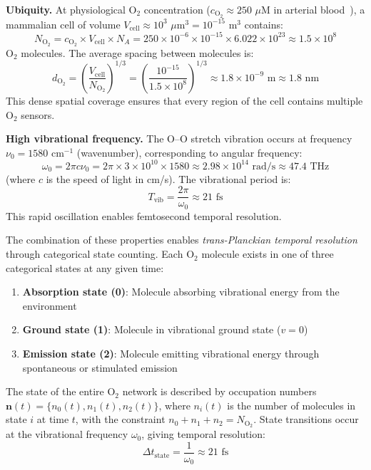 \documentclass[twocolumn,10pt,aps,prd,superscriptaddress,floatfix,nofootinbib]{revtex4-2}
\theoremstyle{remark}
\begin{document}
\textbf{Ubiquity.} At physiological O$_2$ concentration ($c_{\mathrm{O_2}} \approx 250$ $\mu$M in arterial blood~\cite{Guyton2006}), a mammalian cell of volume $V_{\mathrm{cell}} \approx 10^{3}$ $\mu$m$^3 = 10^{-15}$ m$^3$ contains:
\begin{equation}
N_{\mathrm{O_2}} = c_{\mathrm{O_2}} \times V_{\mathrm{cell}} \times N_A = 250 \times 10^{-6} \times 10^{-15} \times 6.022 \times 10^{23} \approx 1.5 \times 10^{8}
\label{eq:oxygen_number}
\end{equation}
O$_2$ molecules. The average spacing between molecules is:
\begin{equation}
d_{\mathrm{O_2}} = \left(\frac{V_{\mathrm{cell}}}{N_{\mathrm{O_2}}}\right)^{1/3} = \left(\frac{10^{-15}}{1.5 \times 10^{8}}\right)^{1/3} \approx 1.8 \times 10^{-9} \text{ m} \approx 1.8 \text{ nm}
\end{equation}
This dense spatial coverage ensures that every region of the cell contains multiple O$_2$ sensors.

\textbf{High vibrational frequency.} The O--O stretch vibration occurs at frequency $\nu_0 = 1580$ cm$^{-1}$ (wavenumber), corresponding to angular frequency:
\begin{equation}
\omega_0 = 2\pi c \nu_0 = 2\pi \times 3 \times 10^{10} \times 1580 \approx 2.98 \times 10^{14} \text{ rad/s} \approx 47.4 \text{ THz}
\label{eq:oxygen_frequency}
\end{equation}
(where $c$ is the speed of light in cm/s). The vibrational period is:
\begin{equation}
T_{\mathrm{vib}} = \frac{2\pi}{\omega_0} \approx 21 \text{ fs}
\end{equation}
This rapid oscillation enables femtosecond temporal resolution.

The combination of these properties enables \textit{trans-Planckian temporal resolution} through categorical state counting. Each O$_2$ molecule exists in one of three categorical states at any given time:
\begin{enumerate}
\item \textbf{Absorption state (0)}: Molecule absorbing vibrational energy from the environment
\item \textbf{Ground state (1)}: Molecule in vibrational ground state ($v = 0$)
\item \textbf{Emission state (2)}: Molecule emitting vibrational energy through spontaneous or stimulated emission
\end{enumerate}

The state of the entire O$_2$ network is described by occupation numbers $\mathbf{n}(t) = \{n_0(t), n_1(t), n_2(t)\}$, where $n_i(t)$ is the number of molecules in state $i$ at time $t$, with the constraint $n_0 + n_1 + n_2 = N_{\mathrm{O_2}}$. State transitions occur at the vibrational frequency $\omega_0$, giving temporal resolution:
\begin{equation}
\Delta t_{\mathrm{state}} = \frac{1}{\omega_0} \approx 21 \text{ fs}
\end{equation}
\end{document}
